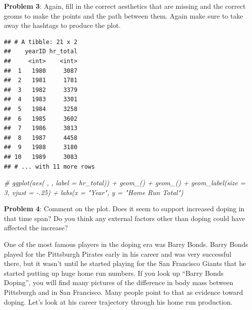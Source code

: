 \documentclass[
]{article}
\newenvironment{Shaded}{\begin{snugshade}}{\end{snugshade}}
\newcommand{\CommentTok}[1]{\textcolor[rgb]{0.56,0.35,0.01}{\textit{#1}}}
\newcommand{\DataTypeTok}[1]{\textcolor[rgb]{0.13,0.29,0.53}{#1}}
\newcommand{\DecValTok}[1]{\textcolor[rgb]{0.00,0.00,0.81}{#1}}
\newcommand{\KeywordTok}[1]{\textcolor[rgb]{0.13,0.29,0.53}{\textbf{#1}}}
\newcommand{\NormalTok}[1]{#1}
\newcommand{\OperatorTok}[1]{\textcolor[rgb]{0.81,0.36,0.00}{\textbf{#1}}}
\newcommand{\StringTok}[1]{\textcolor[rgb]{0.31,0.60,0.02}{#1}}
\begin{document}
\textbf{Problem 3}: Again, fill in the correct aesthetics that are
missing and the correct geoms to make the points and the path between
them. Again make sure to take away the hashtags to produce the plot.

\begin{Shaded}
\end{Shaded}

\begin{verbatim}
## # A tibble: 21 x 2
##    yearID hr_total
##     <int>    <int>
##  1   1980     3087
##  2   1981     1781
##  3   1982     3379
##  4   1983     3301
##  5   1984     3258
##  6   1985     3602
##  7   1986     3813
##  8   1987     4458
##  9   1988     3180
## 10   1989     3083
## # ... with 11 more rows
\end{verbatim}

\begin{Shaded}
\begin{Highlighting}[]
     \CommentTok{# ggplot(aes( , , label = hr_total)) + geom_() + geom_() + geom_label(size = 3, vjust = -.25) + labs(x = "Year", y = "Home Run Total")}
\end{Highlighting}
\end{Shaded}

\textbf{Problem 4}: Comment on the plot. Does it seem to support
increased doping in that time span? Do you think any external factors
other than doping could have affected the increase?

One of the most famous players in the doping era was Barry Bonds. Barry
Bonds played for the Pittsburgh Pirates early in his career and was very
successful there, but it wasn't until he started playing for the San
Francisco Giants that he started putting up huge home run numbers. If
you look up ``Barry Bonds Doping'', you will find many pictures of the
difference in body mass between Pittsburgh and in San Francisco. Many
people point to that as evidence toward doping. Let's look at his career
trajectory through his home run production.
\end{document}
